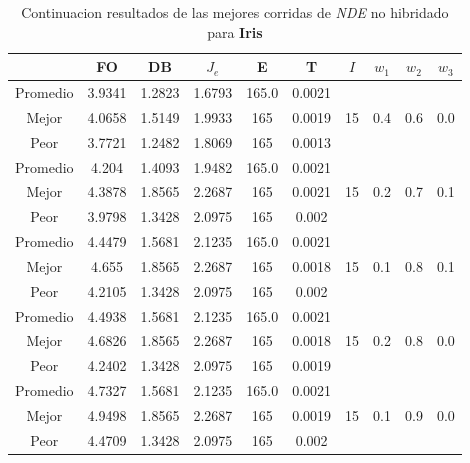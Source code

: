 \begin{table}[h!]
    \footnotesize
    \begin{center}
        \begin{tabular}{|c|c|c|c|c|c|c|c|c|c|}
        \hline
            & {\bf FO} & {\bf DB} & $J_e$ & {\bf E} & {\bf T} & $I$ & $w_1$ & $w_2$ & $w_3$ \\
        \hline
        \hline
            Promedio  & 3.9341 & 1.2823 & 1.6793 & 165.0 & 0.0021 &  &  &  & \\
            \cline{1-6}
            Mejor & 4.0658 & 1.5149  & 1.9933 & 165 & 0.0019 & 15 & 0.4 & 0.6 & 0.0\\
            \cline{1-6}
            Peor & 3.7721 & 1.2482  & 1.8069 & 165 & 0.0013 &  &  &  & \\
        \hline
        \hline
            Promedio  & 4.204 & 1.4093 & 1.9482 & 165.0 & 0.0021 &  &  &  & \\
            \cline{1-6}
            Mejor & 4.3878 & 1.8565  & 2.2687 & 165 & 0.0021 & 15 & 0.2 & 0.7 & 0.1\\
            \cline{1-6}
            Peor & 3.9798 & 1.3428  & 2.0975 & 165 & 0.002 &  &  &  & \\
        \hline
        \hline
            Promedio  & 4.4479 & 1.5681 & 2.1235 & 165.0 & 0.0021 &  &  &  & \\
            \cline{1-6}
            Mejor & 4.655 & 1.8565  & 2.2687 & 165 & 0.0018 & 15 & 0.1 & 0.8 & 0.1\\
            \cline{1-6}
            Peor & 4.2105 & 1.3428  & 2.0975 & 165 & 0.002 &  &  &  & \\
        \hline
        \hline
            Promedio  & 4.4938 & 1.5681 & 2.1235 & 165.0 & 0.0021 &  &  &  & \\
            \cline{1-6}
            Mejor & 4.6826 & 1.8565  & 2.2687 & 165 & 0.0018 & 15 & 0.2 & 0.8 & 0.0\\
            \cline{1-6}
            Peor & 4.2402 & 1.3428  & 2.0975 & 165 & 0.0019 &  &  &  & \\
        \hline
        \hline
            Promedio  & 4.7327 & 1.5681 & 2.1235 & 165.0 & 0.0021 &  &  &  & \\
            \cline{1-6}
            Mejor & 4.9498 & 1.8565  & 2.2687 & 165 & 0.0019 & 15 & 0.1 & 0.9 & 0.0\\
            \cline{1-6}
            Peor & 4.4709 & 1.3428  & 2.0975 & 165 & 0.002 &  &  &  & \\
        \hline
        \end{tabular}
        \caption{Continuacion resultados de las mejores corridas de \emph{NDE} no hibridado para {\bf Iris}}
        \label{tb:tabledealgcsvc}
    \end{center}
\end{table}
